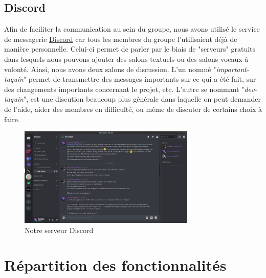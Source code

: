 		\subsection{Discord}

			Afin de faciliter la communication au sein du groupe, nous avons utilisé le service de messagerie \href{https://discordapp.com}{Discord} car tous les membres du groupe l'utilisaient déjà de manière personnelle. Celui-ci permet de parler par le biais de "serveurs" gratuits dans lesquels nous pouvons ajouter des salons textuels ou des salons vocaux à volonté. Ainsi, nous avons deux salons de discussion. L'un nommé "\textit{important-taquin}" permet de transmettre des messages importants sur ce qui a été fait, sur des changements importants concernant le projet, etc. L'autre se nommant "\textit{dev-taquin}", est une discution beaucoup plus générale dans laquelle on peut demander de l'aide, aider des membres en difficulté, ou même de discuter de certains choix à faire.

			\begin{figure}[H]
				\centering\includegraphics[width=0.75\textwidth, keepaspectratio]{img/discord.png}
				\caption{Notre serveur Discord}
			\end{figure}

	\section{Répartition des fonctionnalités}

